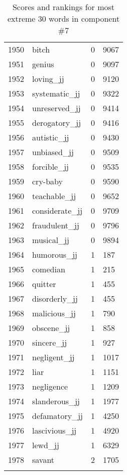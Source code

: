 \begin{longtable}[!htbp]{| rlr@{.}l |}
    1950 & bitch & 0 & 9067 \\
    1951 & genius & 0 & 9097 \\
    1952 & loving\_jj & 0 & 9120 \\
    1953 & systematic\_jj & 0 & 9322 \\
    1954 & unreserved\_jj & 0 & 9414 \\
    1955 & derogatory\_jj & 0 & 9416 \\
    1956 & autistic\_jj & 0 & 9430 \\
    1957 & unbiased\_jj & 0 & 9509 \\
    1958 & forcible\_jj & 0 & 9535 \\
    1959 & cry-baby & 0 & 9590 \\
    1960 & teachable\_jj & 0 & 9652 \\
    1961 & considerate\_jj & 0 & 9709 \\
    1962 & fraudulent\_jj & 0 & 9796 \\
    1963 & musical\_jj & 0 & 9894 \\
    1964 & humorous\_jj & 1 & 187 \\
    1965 & comedian & 1 & 215 \\
    1966 & quitter & 1 & 455 \\
    1967 & disorderly\_jj & 1 & 455 \\
    1968 & malicious\_jj & 1 & 790 \\
    1969 & obscene\_jj & 1 & 858 \\
    1970 & sincere\_jj & 1 & 927 \\
    1971 & negligent\_jj & 1 & 1017 \\
    1972 & liar & 1 & 1151 \\
    1973 & negligence & 1 & 1209 \\
    1974 & slanderous\_jj & 1 & 1977 \\
    1975 & defamatory\_jj & 1 & 4250 \\
    1976 & lascivious\_jj & 1 & 4920 \\
    1977 & lewd\_jj & 1 & 6329 \\
    1978 & savant & 2 & 1705 \\
    \hline
    \caption{Scores and rankings for most extreme 30 words in component \#7} \\
\end{longtable}
